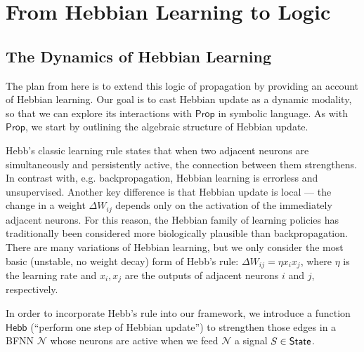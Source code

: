 \documentclass[letterpaper]{article}
\theoremstyle{definition}
\newcommand{\State}{\mbox{\sf State}}
\newcommand{\Prop}{\textsf{Prop}}
\newcommand{\Hebb}{\textsf{Hebb}}
\newcommand{\Net}{\mathcal{N}}
\begin{document}

\section{From Hebbian Learning to Logic}

\subsection{The Dynamics of Hebbian Learning}

The plan from here is to extend this logic of propagation by providing an account of Hebbian learning.  Our goal is to cast Hebbian update as a dynamic modality, so that we can explore its interactions with $\Prop$ in symbolic language.  As with $\Prop$, we start by outlining the algebraic structure of Hebbian update.

Hebb's classic learning rule \citep{hebb-organization-of-behavior-1949} states that when two adjacent neurons are simultaneously and persistently active, the connection between them strengthens.  In contrast with, e.g. backpropagation, Hebbian learning is errorless and unsupervised.  Another key difference is that Hebbian update is local --- the change in a weight $\Delta W_{ij}$ depends only on the activation of the immediately adjacent neurons.  For this reason, the Hebbian family of learning policies has traditionally been considered more biologically plausible than backpropagation.  There are many variations of Hebbian learning, but we only consider the most basic (unstable, no weight decay) form of Hebb's rule:  $\Delta W_{ij} = \eta x_i x_j$, where $\eta$ is the learning rate and $x_i, x_j$ are the outputs of adjacent neurons $i$ and $j$, respectively.

In order to incorporate Hebb's rule into our framework, we introduce a function $\Hebb$ (``perform one step of Hebbian update'') to strengthen those edges in a BFNN $\Net$ whose neurons are active when we feed $\Net$ a signal $S \in \State$.  
\end{document}
